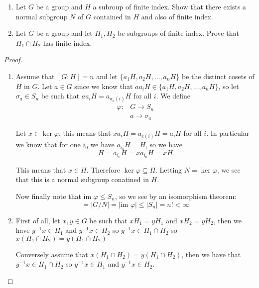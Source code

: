     \begin{exercise}
        \begin{enumerate}[label = (\alph*)]
            \item Let $G$ be a group and $H$ a subroup of finite index. Show that there exists a normal subgroup $N$ of $G$ contained in $H$ and also of finite index.
            \item Let $G$ be a group and let $H_1,H_2$ be subgroups of finite index. Prove that $H_1\cap H_2$ has finite index.
        \end{enumerate}
    \begin{proof}
        \begin{enumerate}[label = (\alph*)]
            \item Assume that $[G\colon H] = n$ and let $\{a_1H,a_2H,\dots, {a_n}H\}$ be the distinct cosets of $H$ in $G$. Let $a\in G$ since we know that ${aa_i}H\in \{a_1H,a_2H,\dots, {a_n}H\}$, so let $\sigma_a\in S_n$ be such that ${aa_i}H = {a_{\sigma_a(i)}}H$ for all $i$. We define\begin{align*}
                \varphi\colon &G\rightarrow S_n\\
                              &a\rightarrow \sigma_a
            \end{align*} 

            Let $x\in \ker \varphi$, this means that ${xa_i}H = a_{e(i)}H = {a_i}H$ for all $i$. In particular we know that for one $i_0$ we have ${a_{i_0}}H = H$, so we have \[H={a_{i_0}}H = x{a_{i_0}}H = xH\]

            This means that $x\in H$. Therefore $\ker\varphi \subseteq H$. Letting $N = \ker\varphi$, we see that this is a normal subgroup conatined in $H$.

            Now finally note that $\text{im }\varphi\leq S_n$, so we see by an isomorphism theorem:\begin{equation*}
                [G\colon N] = |G/N| = |\text{im }\varphi| \leq |S_n| = n!<\infty
            \end{equation*}
            \item First of all, let $x,y\in G$ be such that $xH_1 = yH_1$ and $xH_2 = yH_2$, then we have $y^{-1}x\in H_1$ and $y^{-1}x\in H_2$ so $y^{-1}x\in H_1\cap H_2$ so $x(H_1\cap H_2) = y(H_1\cap H_2)$ 
            
            Conversely assume that $x(H_1\cap H_2) = y(H_1\cap H_2)$, then we have that $y^{-1}x\in H_1\cap H_2$ so $y^{-1}x\in H_1$ and $y^{-1}x\in H_2$.


\end{enumerate}
\end{proof}
\end{exercise}
